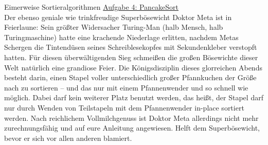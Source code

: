 \begin{frame}{Eimerweise Sortieralgorithmen}
	\underline{Aufgabe 4: PancakeSort} \\
	Der ebenso geniale wie trinkfreudige Superbösewicht Doktor Meta ist in Feierlaune: Sein größter Widersacher Turing-Man {\small (halb Mensch, halb Turingmaschine)} hatte eine krachende Niederlage erlitten, nachdem Metas Schergen die Tintendüsen seines Schreiblesekopfes mit Sekundenkleber verstopft hatten. Für diesen überwältigenden Sieg schmeißen die großen Bösewichte dieser Welt natürlich eine grandiose Feier. Die Königsdisziplin dieses glorreichen Abends besteht darin, einen Stapel voller unterschiedlich großer Pfannkuchen der Größe nach zu sortieren – und das nur mit einem Pfannenwender und so schnell wie möglich. Dabei darf kein weiterer Platz benutzt werden, das heißt, der Stapel darf nur durch Wenden von Teilstapeln mit dem Pfannenwender in-place sortiert werden. Nach reichlichem Vollmilchgenuss ist Doktor Meta allerdings nicht mehr zurechnungsfähig und auf eure Anleitung angewiesen. Helft dem Superbösewicht, bevor er sich vor allen anderen blamiert.
\end{frame}

